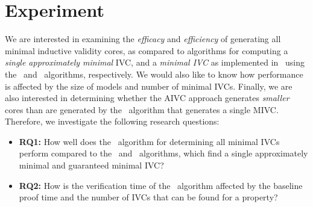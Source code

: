 \section{Experiment}
\label{sec:experiment}

\newcommand{\takeaway}[1]{
\vspace{6pt}
\noindent\fbox{\parbox{\textwidth}{#1}}
\vspace{6pt}
}
We are interested in examining the {\em efficacy} and {\em efficiency} of generating all minimal inductive validity cores, as compared to algorithms for computing a {\em single approximately minimal} IVC, and a {\em minimal IVC} as implemented in~\cite{Ghass16} using the \ucalg\ and \ucbfalg\ algorithms, respectively.  We would also like to know how performance is affected by the size of models and number of minimal IVCs.  Finally, we are also interested in determining whether the AIVC approach generates {\em smaller} cores than are generated by the \ucbfalg\ algorithm that generates a single MIVC.  %
%
%
Therefore, we investigate the following research questions:
\begin{itemize}
  \item \textbf{RQ1:} How well does the \aivcalg ~algorithm for determining all minimal IVCs perform compared to the \ucalg ~and \ucbfalg ~algorithms, which find a single approximately minimal and guaranteed minimal IVC?
  \item \textbf{RQ2:} How is the verification time of the \aivcalg ~algorithm affected by the baseline proof time and the number of IVCs that can be found for a property?
%
\end{itemize}

 
